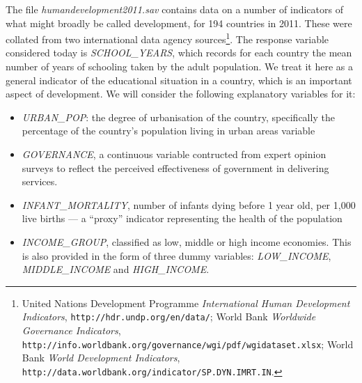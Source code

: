 The file \emph{humandevelopment2011.sav} contains data on a number of indicators of
what might broadly be called development, for 194 countries in 2011. These were collated
from two international data agency sources\footnote{United Nations Development
Programme \emph{International Human Development Indicators},
\texttt{http://hdr.undp.org/en/data/};
World Bank \emph{Worldwide Governance Indicators},
\texttt{http://info.worldbank.org/governance/wgi/pdf/wgidataset.xlsx};
World Bank \emph{World Development Indicators},
\texttt{http://data.worldbank.org/indicator/SP.DYN.IMRT.IN}.
}.
The response
variable considered today is \emph{SCHOOL\_YEARS}, which records for each
country the mean number of years of schooling taken by the adult population.
We treat it here as a general indicator
of the educational situation in a country, which is an important aspect of development.
We will consider the following
explanatory variables for it:
\begin{itemize}

\item
\emph{URBAN\_POP}: the degree of urbanisation of the country, specifically the
percentage of the country's population living in urban areas
variable
\item
\emph{GOVERNANCE}, a continuous variable contructed from expert opinion surveys to reflect the
perceived effectiveness of government in delivering services.
\item
\emph{INFANT\_MORTALITY}, number of infants dying before 1 year old, per
1,000 live births --- a
``proxy'' indicator representing the health of the population
\item
\emph{INCOME\_GROUP}, classified as low, middle or high income
economies.
This is also provided in the form of three dummy variables: \emph{LOW\_INCOME},
 \emph{MIDDLE\_INCOME} and \emph{HIGH\_INCOME}.
\end{itemize}

